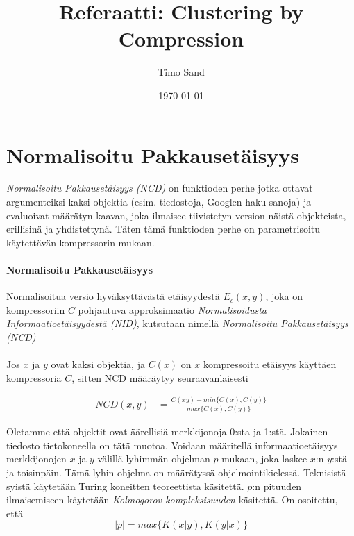 \documentclass[11pt,finnish]{tktltiki2}
\title{Referaatti: Clustering by Compression}
\author{Timo Sand}
\date{\today}
\theoremstyle{definition}
\theoremstyle{remark}
\begin{document}

\frontmatter      %

\maketitle        %



\mainmatter       %

\section{Normalisoitu Pakkausetäisyys} %
\label{sec:normalisoitu_pakkauset_isyys}

  \emph{Normalisoitu Pakkausetäisyys (NCD)} on funktioden perhe jotka ottavat argumenteiksi kaksi objektia (esim. tiedostoja, Googlen haku sanoja) ja evaluoivat määrätyn kaavan, joka ilmaisee tiivistetyn version näistä objekteista, erillisinä ja yhdistettynä. Täten tämä funktioden perhe on parametrisoitu käytettävän kompressorin mukaan.

  \paragraph{Normalisoitu Pakkausetäisyys} %
  \label{par:normalisoitu_pakkauset_isyys}

    Normalisoitua versio hyväksyttävästä etäisyydestä $E_c(x,y)$, joka on kompressoriin $C$ pohjautuva approksimaatio \emph{Normalisoidusta Informaatioetäisyydestä (NID)}, kutsutaan nimellä \emph{Normalisoitu Pakkausetäisyys (NCD)} \cite{CV05}
  \\\\
    Jos $x$ ja $y$ ovat kaksi objektia, ja $C(x)$ on $x$ kompressoitu etäisyys  käyttäen kompressoria $C$, sitten NCD määräytyy seuraavanlaisesti

    \begin{align*}
      NCD(x,y) &= \frac{C(xy)-min\{C(x),C(y)\}}{max\{C(x),C(y)\}}
    \end{align*}

    Oletamme että objektit ovat äärellisiä merkkijonoja 0:sta ja 1:stä. Jokainen tiedosto tietokoneella on tätä muotoa. Voidaan määritellä informaatioetäisyys merkkijonojen $x$ ja $y$ välillä lyhimmän ohjelman $p$ mukaan, joka laskee $x$:n $y$:stä ja toisinpäin. Tämä lyhin ohjelma on määrätyssä ohjelmointikielessä. Teknisistä syistä käytetään Turing koneitten teoreettista käsitettä.
    $p$:n pituuden ilmaisemiseen käytetään \emph{Kolmogorov kompleksisuuden} käsitettä. On osoitettu, että
    $$|p| = max\{K(x|y),K(y|x)\}$$
\end{document}
